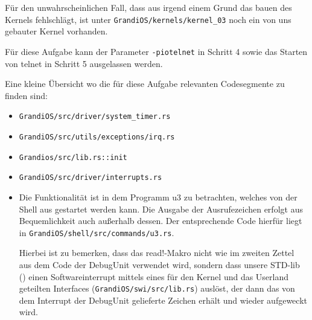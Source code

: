 \begin{description}
Für den unwahrscheinlichen Fall, dass aus irgend einem Grund das bauen des Kernels fehlschlägt, ist unter {\texttt{GrandiOS/kernels/kernel\_03}} noch ein von uns gebauter Kernel vorhanden.

Für diese Aufgabe kann der Parameter \texttt{-piotelnet} in Schritt 4 sowie das Starten von telnet in Schritt 5 ausgelassen werden.

Eine kleine Übersicht wo die für diese Aufgabe relevanten Codesegmente zu finden sind:
\begin{itemize}
	\item \texttt{GrandiOS/src/driver/system\_timer.rs}
	\item \texttt{GrandiOS/src/utils/exceptions/irq.rs}
	\item \texttt{Grandios/src/lib.rs::init}
	\item \texttt{GrandiOS/src/driver/interrupts.rs}
        \item Die Funktionalität ist in dem Programm u3 zu betrachten, welches von der Shell aus gestartet werden kann. Die Ausgabe der Ausrufezeichen erfolgt aus Bequemlichkeit auch außerhalb dessen. Der entsprechende Code hierfür liegt in \texttt{GrandiOS/shell/src/commands/u3.rs}.
          
          Hierbei ist zu bemerken, dass das read!-Makro nicht wie im zweiten Zettel aus dem Code der DebugUnit verwendet wird, sondern dass unsere STD-lib () einen Softwareinterrupt mittels eines für den Kernel und das Userland geteilten Interfaces (\texttt{GrandiOS/swi/src/lib.rs}) auslöst, der dann das von dem Interrupt der DebugUnit gelieferte Zeichen erhält und wieder aufgeweckt wird.
\end{itemize}

\end{description}

